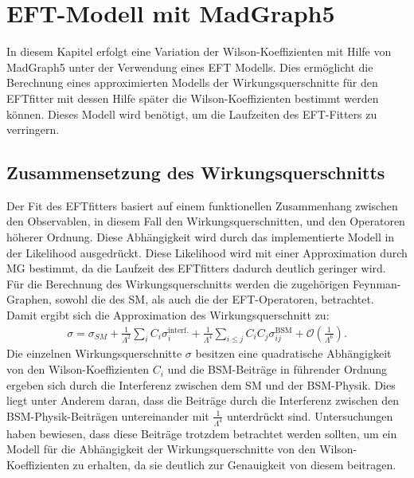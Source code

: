 \chapter{EFT-Modell mit MadGraph5}
In diesem Kapitel erfolgt eine Variation der Wilson-Koeffizienten mit Hilfe  von MadGraph5 unter der Verwendung eines EFT Modells. Dies ermöglicht die Berechnung eines approximierten Modells der Wirkungsquerschnitte für den EFTfitter mit dessen Hilfe später die Wilson-Koeffizienten bestimmt werden können. Dieses Modell wird benötigt, um die Laufzeiten des EFT-Fitters zu verringern.

\section{Zusammensetzung des Wirkungsquerschnitts}
Der Fit des EFTfitters basiert auf einem funktionellen Zusammenhang zwischen den Observablen, in diesem Fall den Wirkungsquerschnitten, und den Operatoren höherer Ordnung. Diese Abhängigkeit wird durch das implementierte Modell in der Likelihood ausgedrückt. Diese Likelihood wird mit einer Approximation durch MG bestimmt, da die Laufzeit des EFTfitters dadurch deutlich geringer wird.\\
Für die Berechnung des Wirkungsquerschnitts werden die zugehörigen Feynman-Graphen, sowohl die des SM, als auch die der EFT-Operatoren, betrachtet. Damit ergibt sich die Approximation des Wirkungsquerschnitt zu:
\begin{align}
  \sigma = \sigma_{SM} + \frac{1}{\Lambda^2} \sum_{i} C_i \sigma_i^\text{interf.} + \frac{1}{\Lambda^4} \sum_{i \leq j} C_i C_j \sigma_{ij}^\text{BSM} + \mathcal{O} \left(\frac{1}{\Lambda^6}\right).
\end{align}
Die einzelnen Wirkungsquerschnitte $\sigma$ besitzen eine quadratische Abhängigkeit von den Wilson-Koeffizienten $C_i$ und die BSM-Beiträge in führender Ordnung ergeben sich durch die Interferenz zwischen dem SM und der BSM-Physik. Dies liegt unter Anderem daran, dass die Beiträge durch die Interferenz zwischen den BSM-Physik-Beiträgen untereinander mit $\frac{1}{\Lambda^4}$ unterdrückt sind. Untersuchungen\cite{Wilson-Beiträge} haben bewiesen, dass diese Beiträge trotzdem betrachtet werden sollten, um ein Modell für die Abhängigkeit der Wirkungsquerschnitte von den Wilson-Koeffizienten zu erhalten, da sie deutlich zur Genauigkeit von diesem beitragen.

